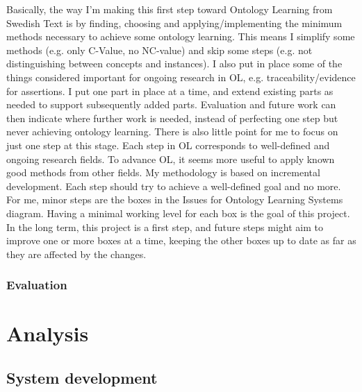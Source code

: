 \documentclass[a4paper]{report}
\begin{document}
Basically, the way I'm making this first step toward Ontology Learning from Swedish Text is by finding, choosing and applying/implementing the minimum methods necessary to achieve some ontology learning. This means I simplify some methods (e.g. only C-Value, no NC-value) and skip some steps (e.g. not distinguishing between concepts and instances). I also put in place some of the things considered important for ongoing research in OL, e.g. traceability/evidence for assertions. I put one part in place at a time, and extend existing parts as needed to support subsequently added parts. Evaluation and future work can then indicate where further work is needed, instead of perfecting one step but never achieving ontology learning. There is also little point for me to focus on just one step at this stage. Each step in OL corresponds to well-defined and ongoing research fields. To advance OL, it seems more useful to apply known good methods from other fields. My methodology is based on incremental development. Each step should try to achieve a well-defined goal and no more. For me, minor steps are the boxes in the Issues for Ontology Learning Systems diagram. Having a minimal working level for each box is the goal of this project. In the long term, this project is a first step, and future steps might aim to improve one or more boxes at a time, keeping the other boxes up to date as far as they are affected by the changes.

\subsection{Evaluation}
\label{sec:methods:evaluation}

\chapter{Analysis}
\label{chapter:analysis}

\section{System development}
\end{document}
